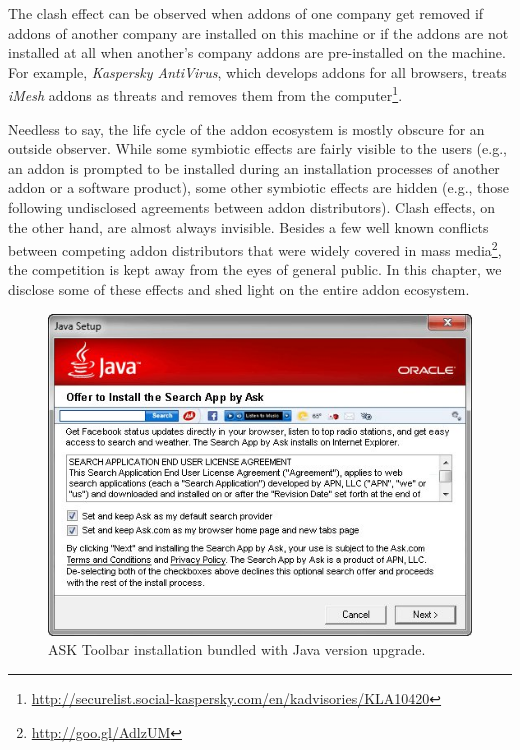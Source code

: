 \documentclass[11pt,oneside]{book}
\begin{document}
The clash effect can be observed when addons of one company get removed if addons of another company are installed on this machine or if the addons are not installed at all when another's company addons are pre-installed on the machine. For example, \emph{Kaspersky AntiVirus}, which develops addons for all browsers, treats \emph{iMesh} addons as threats and removes them from the computer\footnote{\url{http://securelist.social-kaspersky.com/en/kadvisories/KLA10420}}.

Needless to say, the life cycle of the addon ecosystem is mostly obscure for an outside observer. While some symbiotic effects are fairly visible to the users (e.g., an addon is prompted to be installed during an installation processes of another addon or a software product), some other symbiotic effects are hidden (e.g., those following undisclosed agreements between addon distributors). Clash effects, on the other hand, are almost always invisible. Besides a few well known conflicts between competing addon distributors that were widely covered in mass media\footnote{\url{http://goo.gl/AdlzUM}}, the competition is kept away from the eyes of general public. In this chapter, we disclose some of these effects and shed light on the entire addon ecosystem. 

\begin{figure}[!htbp]
\centering
\includegraphics[scale=.8,angle=0]{figures/ask_offer.png}
\caption{ASK Toolbar installation bundled with Java version upgrade.}
\label{fig:ask_offer}
\end{figure} 
\end{document}
